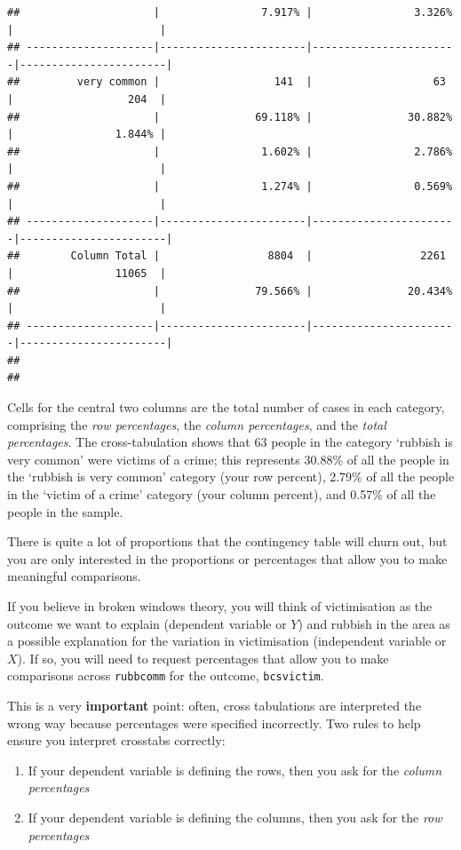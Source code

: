 \documentclass[
]{book}
\begin{document}
\begin{verbatim}
##                     |                7.917% |                3.326% |                       | 
## --------------------|-----------------------|-----------------------|-----------------------|
##         very common |                  141  |                   63  |                  204  | 
##                     |               69.118% |               30.882% |                1.844% | 
##                     |                1.602% |                2.786% |                       | 
##                     |                1.274% |                0.569% |                       | 
## --------------------|-----------------------|-----------------------|-----------------------|
##        Column Total |                 8804  |                 2261  |                11065  | 
##                     |               79.566% |               20.434% |                       | 
## --------------------|-----------------------|-----------------------|-----------------------|
## 
## 
\end{verbatim}

Cells for the central two columns are the total number of cases in each category, comprising the \emph{row percentages}, the \emph{column percentages}, and the \emph{total percentages}.
The cross-tabulation shows that 63 people in the category `rubbish is very common' were victims of a crime; this represents 30.88\% of all the people in the `rubbish is very common' category (your row percent), 2.79\% of all the people in the `victim of a crime' category (your column percent), and 0.57\% of all the people in the sample.

There is quite a lot of proportions that the contingency table will churn out, but you are only interested in the proportions or percentages that allow you to make meaningful comparisons.

If you believe in broken windows theory, you will think of victimisation as the outcome we want to explain (dependent variable or \(Y\)) and rubbish in the area as a possible explanation for the variation in victimisation (independent variable or \(X\)). If so, you will need to request percentages that allow you to make comparisons across \texttt{rubbcomm} for the outcome, \texttt{bcsvictim}.

This is a very \textbf{important} point: often, cross tabulations are interpreted the wrong way because percentages were specified incorrectly. Two rules to help ensure you interpret crosstabs correctly:

\begin{enumerate}
\def\labelenumi{\arabic{enumi}.}
\item
  If your dependent variable is defining the rows, then you ask for the \emph{column percentages}
\item
  If your dependent variable is defining the columns, then you ask for the \emph{row percentages}
\end{enumerate}
\end{document}

